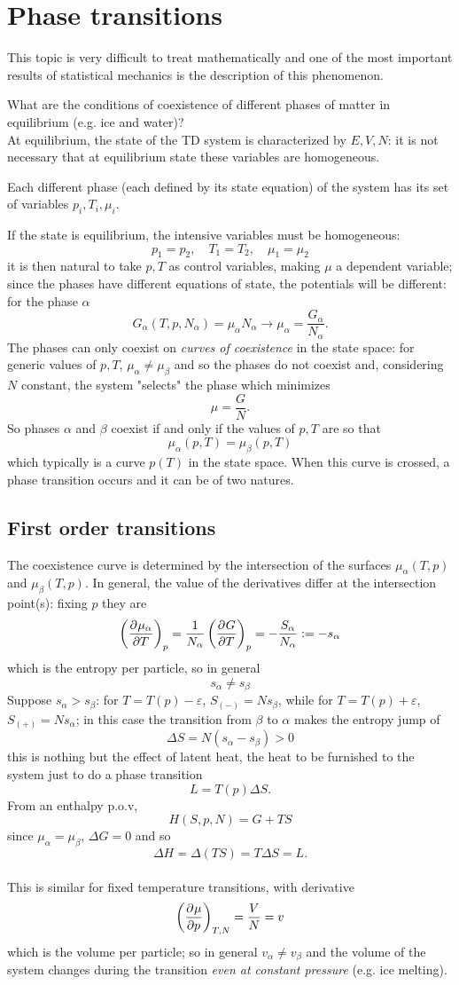 \section{Phase transitions}
This topic is very difficult to treat mathematically and one of the most important
results of statistical mechanics is the description of this phenomenon.

What are the conditions of coexistence of different phases of matter in equilibrium
(e.g. ice and water)?\\
At equilibrium, the state of the TD system is characterized by $E,V,N$: it is not
necessary that at equilibrium state these variables are homogeneous.

Each different phase (each defined by its state equation) of the system has its set
of variables $p_i,T_i,\mu_i$.

If the state is equilibrium, the intensive variables must be homogeneous:
$$p_1=p_2,\quad T_1=T_2,\quad\mu_1=\mu_2$$
it is then natural to take $p,T$ as control variables, making $\mu$ a dependent
variable; since the phases have different equations of state, the potentials will
be different: for the phase $\alpha$
$$G_\alpha(T,p,N_\alpha) = \mu_\alpha N_\alpha \rightarrow \mu_\alpha =
\frac{G_\alpha}{N_\alpha}.$$
The phases can only coexist on \textit{curves of coexistence} in the state space:
for generic values of $p,T$, $\mu_\alpha\neq\mu_\beta$ and so the phases do not
coexist and, considering $N$ constant, the system "selects" the phase which minimizes
$$\mu=\frac{G}{N}.$$
So phases $\alpha$ and $\beta$ coexist if and only if the values of $p,T$ are so that
$$\mu_\alpha(p,T) = \mu_\beta(p,T)$$
which typically is a curve $p(T)$ in the state space. When this curve is crossed, a
phase transition occurs and it can be of two natures.
\subsection{First order transitions}   
The coexistence curve is determined by the intersection of the surfaces
$\mu_\alpha(T,p)$ and $\mu_\beta(T,p)$. In general, the value of the derivatives
differ at the intersection point(s): fixing $p$ they are
$$\left(\pdv[]{\mu_\alpha}{T}\right)_{p} = \frac{1}{N_\alpha}\left(\pdv[]{G}{T}
\right)_p = -\frac{S_\alpha}{N_\alpha}:=-s_\alpha$$
which is the entropy per particle, so in general
$$s_\alpha\neq s_\beta$$
Suppose $s_\alpha >s_\beta$: for $T=T(p)-\varepsilon$, $S_{(-)} = Ns_\beta$,
while for $T=T(p)+\varepsilon$, $S_{(+)} = Ns_\alpha$; in this case the
transition from $\beta$ to $\alpha$ makes the entropy jump of
$$\Delta S = N(s_\alpha-s_\beta)>0$$
this is nothing but the effect of latent heat, the heat to be furnished to the
system just to do a phase transition
$$L=T(p)\Delta S.$$
From an enthalpy p.o.v,
$$H(S,p,N) = G+TS$$
since $\mu_\alpha = \mu_\beta$, $\Delta G = 0$ and so
$$\Delta H = \Delta(TS) = T\Delta S = L.$$\\

This is similar for fixed temperature transitions, with derivative
$$\left(\pdv[]{\mu}{p}\right)_{T,N} = \frac{V}{N}=v$$
which is the volume per particle; so in general $v_\alpha\neq v_\beta$ and the
volume of the system changes during the transition
\textit{even at constant pressure} (e.g. ice melting).
